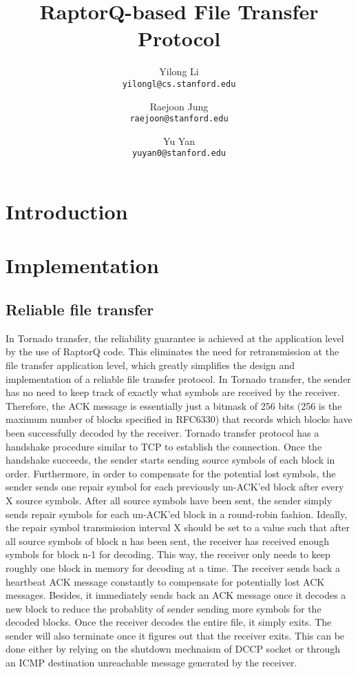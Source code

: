 \documentclass{sig-alternate-10pt}
\begin{document}
\title{RaptorQ-based File Transfer Protocol}
\author{
  Yilong Li\\
  \texttt{yilongl@cs.stanford.edu}
  \and 
  Raejoon Jung\\
  \texttt{raejoon@stanford.edu}
  \and
  Yu Yan\\
  \texttt{yuyan0@stanford.edu}
}

\maketitle
\section{Introduction}

\section{Implementation}

\subsection{Reliable file transfer}

In Tornado transfer, the reliability guarantee is achieved at the application level by the use of RaptorQ code. This eliminates the need for retransmission at the file transfer application level, which greatly simplifies the design and implementation of a reliable file transfer protocol. In Tornado transfer, the sender has no need to keep track of exactly what symbols are received by the receiver. Therefore, the ACK message is essentially just a bitmask of 256 bits (256 is the maximum number of blocks specified in RFC6330) that records which blocks have been successfully decoded by the receiver. Tornado transfer protocol has a handshake procedure similar to TCP to establish the connection. Once the handshake succeeds, the sender starts sending source symbols of each block in order. Furthermore, in order to compensate for the potential lost symbols, the sender sends one repair symbol for each previously un-ACK'ed block after every X source symbols. After all source symbols have been sent, the sender simply sends repair symbols for each un-ACK'ed block in a round-robin fashion. Ideally, the repair symbol transmission interval X should be set to a value such that after all source symbols of block n has been sent, the receiver has received enough symbols for block n-1 for decoding. This way, the receiver only needs to keep roughly one block in memory for decoding at a time. The receiver sends back a heartbeat ACK message constantly to compensate for potentially lost ACK messages. Besides, it immediately sends back an ACK message once it decodes a new block to reduce the probablity of sender sending more symbols for the decoded blocks. Once the receiver decodes the entire file, it simply exits. The sender will also terminate once it figures out that the receiver exits. This can be done either by relying on the shutdown mechnaism of DCCP socket or through an ICMP destination unreachable message generated by the receiver.
\end{document}
